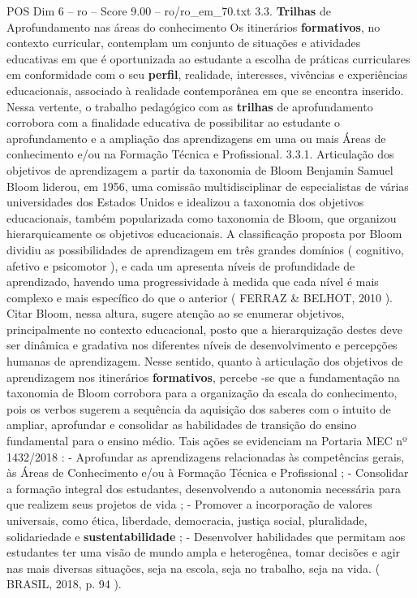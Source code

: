 \begin{textsample}{POS Dim 6 – ro – Score 9.00 – ro/ro\_em\_70.txt}  \label{ex:f6_pos_140}
3.3. \textbf{Trilhas} de Aprofundamento nas áreas do conhecimento Os itinerários \textbf{formativos}, no contexto curricular, contemplam um conjunto de situações e atividades educativas em que é oportunizada ao estudante a escolha de práticas curriculares em conformidade com o seu \textbf{perfil}, realidade, interesses, vivências e experiências educacionais, associado à realidade contemporânea em que se encontra inserido.
Nessa vertente, o trabalho pedagógico com as \textbf{trilhas} de aprofundamento corrobora com a finalidade educativa de possibilitar ao estudante o aprofundamento e a ampliação das aprendizagens em uma ou mais Áreas de conhecimento e/ou na Formação Técnica e Profissional. 3.3.1.
Articulação dos objetivos de aprendizagem a partir da taxonomia de Bloom Benjamin Samuel Bloom liderou, em 1956, uma comissão multidisciplinar de especialistas de várias universidades dos Estados Unidos e idealizou a taxonomia dos objetivos educacionais, também popularizada como taxonomia de Bloom, que organizou hierarquicamente os objetivos educacionais.
A classificação proposta por Bloom dividiu as possibilidades de aprendizagem em três grandes domínios ( cognitivo, afetivo e psicomotor ), e cada um apresenta níveis de profundidade de aprendizado, havendo uma progressividade à medida que cada nível é mais complexo e mais específico do que o anterior ( FERRAZ \& BELHOT, 2010 ).
Citar Bloom, nessa altura, sugere atenção ao se enumerar objetivos, principalmente no contexto educacional, posto que a hierarquização destes deve ser dinâmica e gradativa nos diferentes níveis de desenvolvimento e percepções humanas de aprendizagem.
Nesse sentido, quanto à articulação dos objetivos de aprendizagem nos itinerários \textbf{formativos}, percebe -se que a fundamentação na taxonomia de Bloom corrobora para a organização da escala do conhecimento, pois os verbos sugerem a sequência da aquisição dos saberes com o intuito de ampliar, aprofundar e consolidar as habilidades de transição do ensino fundamental para o ensino médio.
Tais ações se evidenciam na Portaria MEC nº 1432/2018 : - Aprofundar as aprendizagens relacionadas às competências gerais, às Áreas de Conhecimento e/ou à Formação Técnica e Profissional ; - Consolidar a formação integral dos estudantes, desenvolvendo a autonomia necessária para que realizem seus projetos de vida ; - Promover a incorporação de valores universais, como ética, liberdade, democracia, justiça social, pluralidade, solidariedade e \textbf{sustentabilidade} ; - Desenvolver habilidades que permitam aos estudantes ter uma visão de mundo ampla e heterogênea, tomar decisões e agir nas mais diversas situações, seja na escola, seja no trabalho, seja na vida. ( BRASIL, 2018, p. 94 ).

\end{textsample}
